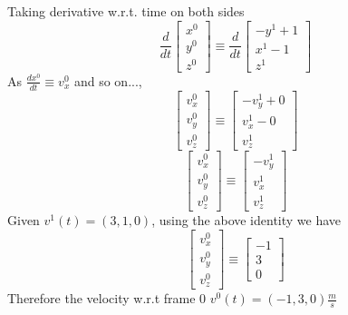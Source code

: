 \documentclass[12pt]{article}
\begin{document}
Taking derivative w.r.t. time on both sides
\[
  \frac{d}{dt}\begin{bmatrix} x^0 \\ y^0 \\ z^0\end{bmatrix} \equiv
  \frac{d}{dt}\begin{bmatrix} -y^1 + 1 \\ x^1 - 1 \\ z^1\end{bmatrix}
\]
As $\frac{dx^0}{dt} \equiv v_x^0$ and so on...,
\[
  \begin{bmatrix} v_x^0 \\ v_y^0 \\ v_z^0\end{bmatrix} \equiv
  \begin{bmatrix} -v_y^1 + 0 \\ v_x^1 - 0 \\ v_z^1\end{bmatrix}
\]
\[
  \begin{bmatrix} v_x^0 \\ v_y^0 \\ v_z^0\end{bmatrix} \equiv
  \begin{bmatrix} -v_y^1 \\ v_x^1 \\ v_z^1\end{bmatrix}
\]
Given $v^1(t) = (3, 1, 0)$, using the above identity we have
\[
  \begin{bmatrix} v_x^0 \\ v_y^0 \\ v_z^0\end{bmatrix} \equiv
  \begin{bmatrix} -1 \\ 3 \\ 0\end{bmatrix}
\]
Therefore the velocity w.r.t frame 0 $v^0(t) = (-1, 3, 0) \frac{m}{s}$

\pagebreak

\section{}
\end{document}
